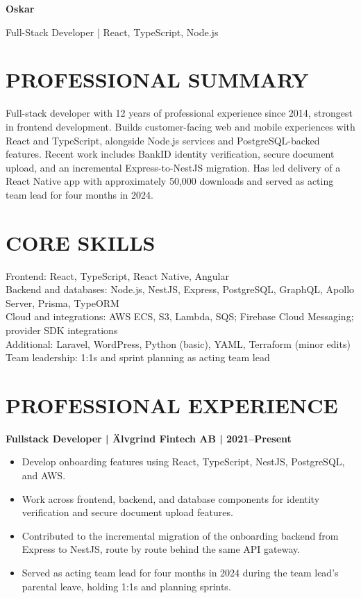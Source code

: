 \documentclass[11pt,a4paper]{article}
\begin{document}
{\centering
{\Huge\bfseries\color{primarycolor} Oskar}\par
\vspace{0.35em}
{\large\color{accentcolor} Full-Stack Developer | React, TypeScript, Node.js}\par
}
\vspace{0.7em}

\section*{PROFESSIONAL SUMMARY}
Full-stack developer with 12 years of professional experience since 2014, strongest in frontend development. Builds customer-facing web and mobile experiences with React and TypeScript, alongside Node.js services and PostgreSQL-backed features. Recent work includes BankID identity verification, secure document upload, and an incremental Express-to-NestJS migration. Has led delivery of a React Native app with approximately 50,000 downloads and served as acting team lead for four months in 2024.

\section*{CORE SKILLS}
Frontend: React, TypeScript, React Native, Angular\\
Backend and databases: Node.js, NestJS, Express, PostgreSQL, GraphQL, Apollo Server, Prisma, TypeORM\\
Cloud and integrations: AWS ECS, S3, Lambda, SQS; Firebase Cloud Messaging; provider SDK integrations\\
Additional: Laravel, WordPress, Python (basic), YAML, Terraform (minor edits)\\
Team leadership: 1:1s and sprint planning as acting team lead

\section*{PROFESSIONAL EXPERIENCE}
\noindent\textbf{Fullstack Developer | Älvgrind Fintech AB | 2021–Present}
\begin{itemize}
\item Develop onboarding features using React, TypeScript, NestJS, PostgreSQL, and AWS.
\item Work across frontend, backend, and database components for identity verification and secure document upload features.
\item Contributed to the incremental migration of the onboarding backend from Express to NestJS, route by route behind the same API gateway.
\item Served as acting team lead for four months in 2024 during the team lead’s parental leave, holding 1:1s and planning sprints.
\end{itemize}
\end{document}
